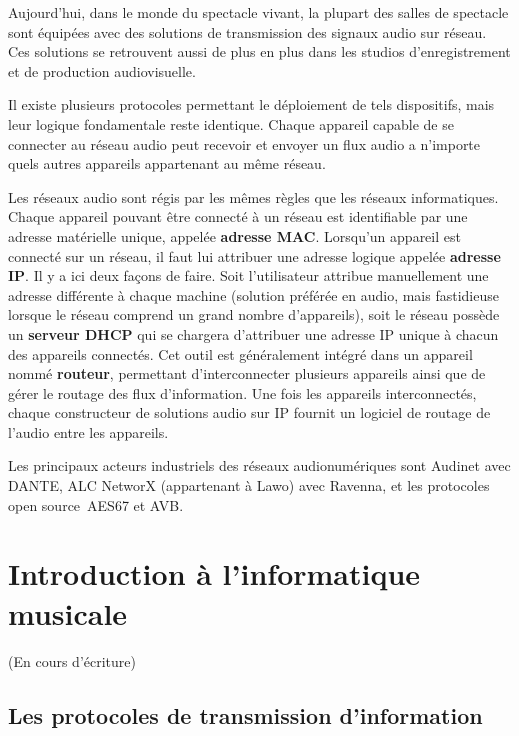 \documentclass[
]{book}
\begin{document}
Aujourd'hui, dans le monde du spectacle vivant, la plupart des salles de spectacle sont équipées avec des solutions de transmission des signaux audio sur réseau. Ces solutions se retrouvent aussi de plus en plus dans les studios d'enregistrement et de production audiovisuelle.

Il existe plusieurs protocoles permettant le déploiement de tels dispositifs, mais leur logique fondamentale reste identique. Chaque appareil capable de se connecter au réseau audio peut recevoir et envoyer un flux audio a n'importe quels autres appareils appartenant au même réseau.

Les réseaux audio sont régis par les mêmes règles que les réseaux informatiques. Chaque appareil pouvant être connecté à un réseau est identifiable par une adresse matérielle unique, appelée \textbf{adresse MAC}. Lorsqu'un appareil est connecté sur un réseau, il faut lui attribuer une adresse logique appelée \textbf{adresse IP}. Il y a ici deux façons de faire. Soit l'utilisateur attribue manuellement une adresse différente à chaque machine (solution préférée en audio, mais fastidieuse lorsque le réseau comprend un grand nombre d'appareils), soit le réseau possède un \textbf{serveur DHCP} qui se chargera d'attribuer une adresse IP unique à chacun des appareils connectés. Cet outil est généralement intégré dans un appareil nommé \textbf{routeur}, permettant d'interconnecter plusieurs appareils ainsi que de gérer le routage des flux d'information. Une fois les appareils interconnectés, chaque constructeur de solutions audio sur IP fournit un logiciel de routage de l'audio entre les appareils.

Les principaux acteurs industriels des réseaux audionumériques sont Audinet avec DANTE, ALC NetworX (appartenant à Lawo) avec Ravenna, et les protocoles open source~AES67 et AVB.

\hypertarget{introduction-uxe0-linformatique-musicale}{%
\chapter{Introduction à l'informatique musicale}\label{introduction-uxe0-linformatique-musicale}}

(En cours d'écriture)

\hypertarget{les-protocoles-de-transmission-dinformation}{%
\section{Les protocoles de transmission d'information}\label{les-protocoles-de-transmission-dinformation}}
\end{document}
